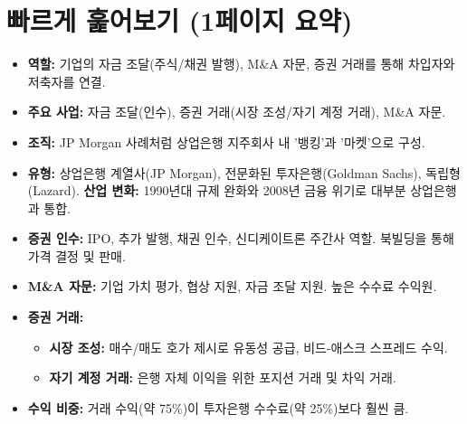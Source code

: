 \documentclass[11pt,a4paper]{article}
\theoremstyle{definition}
\begin{document}
\newpage
\section{빠르게 훑어보기 (1페이지 요약)}

\begin{tcolorbox}[title=\textbf{투자은행의 역할과 조직}]
\begin{itemize}
    \item \textbf{역할:} 기업의 자금 조달(주식/채권 발행), M\&A 자문, 증권 거래를 통해 차입자와 저축자를 연결.
    \item \textbf{주요 사업:} 자금 조달(인수), 증권 거래(시장 조성/자기 계정 거래), M\&A 자문.
    \item \textbf{조직:} JP Morgan 사례처럼 상업은행 지주회사 내 '뱅킹'과 '마켓'으로 구성.
    \item \textbf{유형:} 상업은행 계열사(JP Morgan), 전문화된 투자은행(Goldman Sachs), 독립형(Lazard).
    \textbf{산업 변화:} 1990년대 규제 완화와 2008년 금융 위기로 대부분 상업은행과 통합.
\end{itemize}
\end{tcolorbox}

\begin{tcolorbox}[title=\textbf{투자은행 활동의 세부 사항}]
\begin{itemize}
    \item \textbf{증권 인수:} IPO, 추가 발행, 채권 인수, 신디케이트론 주간사 역할. 북빌딩을 통해 가격 결정 및 판매.
    \item \textbf{M\&A 자문:} 기업 가치 평가, 협상 지원, 자금 조달 지원. 높은 수수료 수익원.
    \item \textbf{증권 거래:}
    \begin{itemize}
        \item \textbf{시장 조성:} 매수/매도 호가 제시로 유동성 공급, 비드-애스크 스프레드 수익.
        \item \textbf{자기 계정 거래:} 은행 자체 이익을 위한 포지션 거래 및 차익 거래.
    \end{itemize}
    \item \textbf{수익 비중:} 거래 수익(약 75\%)이 투자은행 수수료(약 25\%)보다 훨씬 큼.
\end{itemize}
\end{tcolorbox}
\end{document}
